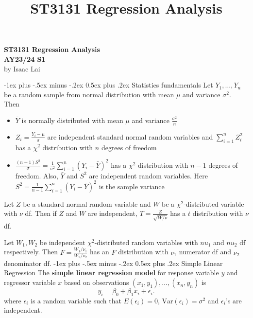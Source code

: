 \documentclass[frenchspacing,9pt,landscape,a4paper]{article}
\title{ST3131 Regression Analysis}
\makeatletter
\renewcommand{\section}{\@startsection{section}{1}{0mm}%
                                {-1ex plus -.5ex minus -.2ex}%
                                {0.5ex plus .2ex}%
                                {\normalfont\large\bfseries}}
\makeatother
\begin{document}
\raggedright
\footnotesize

\begin{multicols}{3}
\setlength{\premulticols}{1pt}
\setlength{\postmulticols}{1pt}
\setlength{\multicolsep}{1pt}
\setlength{\columnsep}{2pt}
\begin{mdframed}
\begin{center}
     \large{\textbf{ST3131 Regression Analysis}} \\
	 \normalsize{\textbf{AY23/24 S1}}\\
	 \small{by Isaac Lai}
\end{center}	
\end{mdframed}

\section{Statistics fundamentals}
Let $Y_1,\dots,Y_n$ be a random sample from normal distribution with mean $\mu$ and variance  $\sigma^2$. Then
\begin{itemize}
	\item $\bar{Y}$ is normally distributed with mean  $\mu$ and variance  $\frac{\sigma^2}{n}$  
	\item $Z_i=\frac{Y_i-\mu}{\sigma}$ are independent standard normal random variables and $\sum_{i=1}^n Z_i^2$ has a $\chi^2$ distribution with  $n$ degrees of freedom
	\item  $\frac{(n-1)S^2}{\sigma}=\frac{1}{\sigma^2}\sum_{i=1}^n(Y_i-\bar{Y})^2$ has a $\chi^2$ distribution with  $n-1$ degrees of freedom. Also,  $\bar{Y}$ and  $S^2$ are independent random variables. Here  $S^2=\frac{1}{n-1}\sum_{i=1}^n(Y_i-\bar{Y})^2$ is the sample variance
\end{itemize}
Let $Z$ be a standard normal random variable and  $W$ be a  $\chi^2$-distributed variable with  $\nu$ df. Then if $Z$ and  $W$ are independent,  $T=\frac{Z}{\sqrt{W /\nu}}$ has a $t$ distribution with  $\nu$ df.

Let  $W_1, W_2$ be independent $\chi^2$-distributed random variables with  $nu_1$ and $nu_2$ df respectively. Then  $F=\frac{W_1 /\nu_1}{W_2/ \nu_2}$ has an $F$ distribution with  $\nu_1$ numerator df and $\nu_2$ denominator df.
\section{Simple Linear Regression}
The \textbf{simple linear regression model} for response variable $y$ and regressor variable  $x$ based on observations  $(x_1,y_1),\dots,(x_n,y_n)$ is 
\[
 y_i=\beta_0+\beta_1x_i+\epsilon_i
.\]
where $\epsilon_i$ is a random variable such that  $E(\epsilon_i)=0$, $\text{Var}(\epsilon_i)=\sigma^2$ and  $\epsilon_i$'s are independent.


\end{multicols}
\end{document}

